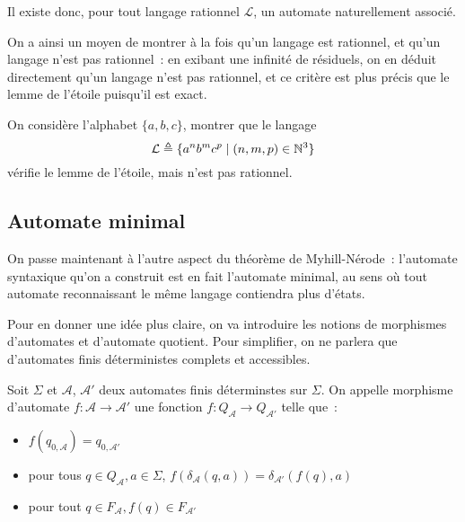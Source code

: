 Il existe donc, pour tout langage rationnel $\mathcal L$, un automate
naturellement associé.

On a ainsi un moyen de montrer à la fois qu'un langage est rationnel, et qu'un
langage n'est pas rationnel~: en exibant une infinité de résiduels, on en
déduit directement qu'un langage n'est pas rationnel, et ce critère est plus
précis que le lemme de l'étoile puisqu'il est exact.

\begin{exercise}
  On considère l'alphabet $\{a,b,c\}$, montrer que le langage
  \[\mathcal L \triangleq \{a^nb^mc^p\mid (n,m,p)\in \mathbb N^3\}\]
  vérifie le lemme de l'étoile, mais n'est pas rationnel.
\end{exercise}

\subsection{Automate minimal}

On passe maintenant à l'autre aspect du théorème de Myhill-Nérode~: l'automate
syntaxique qu'on a construit est en fait l'automate minimal, au sens où tout
automate reconnaissant le même langage contiendra plus d'états.

Pour en donner une idée plus claire, on va introduire les notions de morphismes
d'automates et d'automate quotient. Pour simplifier, on ne parlera que
d'automates finis déterministes complets et accessibles.

\begin{definition}
  Soit $\Sigma$ et $\mathcal A$, $\mathcal A'$ deux automates finis déterminstes
  sur $\Sigma$. On appelle morphisme d'automate $f : \mathcal A \to \mathcal A'$
  une fonction $f : Q_{\mathcal A} \to Q_{\mathcal A'}$ telle que~:
  \begin{itemize}
  \item $f(q_{0,\mathcal A}) = q_{0,\mathcal A'}$
  \item pour tous $q \in Q_{\mathcal A}, a \in \Sigma$,
    $f(\delta_\mathcal A(q,a)) = \delta_{\mathcal A'}(f(q),a)$
  \item pour tout $q \in F_\mathcal A, f(q) \in F_{\mathcal A'}$
  \end{itemize}
\end{definition}

